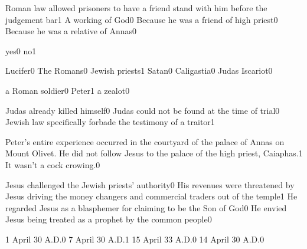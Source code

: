 
{Roman law allowed prisoners to have a friend stand with him before the judgement bar}{1}
{A working of God}{0}
{Because he was a friend of high priest}{0}
{Because he was a relative of Annas}{0}
\qstop

{yes}{0}
{no}{1}
\qstop

{Lucifer}{0}
{The Romans}{0}
{Jewish priests}{1}
{Satan}{0}
{Caligastia}{0}
{Judas Iscariot}{0}
\qstop

{a Roman soldier}{0}
{Peter}{1}
{a zealot}{0}
\qstop


{Judas already killed himself}{0}
{Judas could not be found at the time of trial}{0}
{Jewish law specifically forbade the testimony of a traitor}{1}
\qstop

{Peter's entire experience occurred in the courtyard of the palace of Annas on Mount Olivet. He did not follow Jesus to the palace of the high priest, Caiaphas.}{1}
{It wasn't a cock crowing.}{0}
\qstop

{Jesus challenged the Jewish priests' authority}{0}
{His revenues were threatened by Jesus driving the money changers and commercial traders out of the temple}{1}
{He regarded Jesus as a blasphemer for claiming to be the Son of God}{0}
{He envied Jesus being treated as a prophet by the common people}{0}
\qstop


{1 April 30 A.D.}{0}
{7 April 30 A.D.}{1}
{15 April 33 A.D.}{0}
{14 April 30 A.D.}{0}
\qstop



